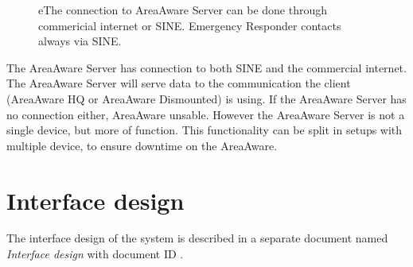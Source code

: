     \begin{figure}[ht]
        \centering
        \quad\quad
        \quad\quad
        \caption{eThe connection to AreaAware Server can be done through commericial internet or SINE. Emergency Responder contacts always via SINE.}
        \label{fig:ce}
    \end{figure}



The AreaAware Server has connection to both SINE and the commercial internet.
The AreaAware Server will serve data to the communication the client (AreaAware HQ or AreaAware Dismounted) is using.
If the AreaAware Server has no connection either, AreaAware unsable.
However the AreaAware Server is not a single device, but more of function.
This functionality can be split in setups with multiple device, to ensure downtime on the AreaAware.


\section{Interface design}
\label{sec:arch_interface}
The interface design of the system is described in a separate document named \emph{Interface design} with document ID . 